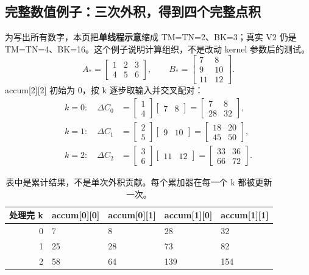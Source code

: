 \subsection{完整数值例子：三次外积，得到四个完整点积}
为写出所有数字，本页把\textbf{单线程示意}缩成 TM=TN=2、BK=3；真实 V2 仍是 TM=TN=4、BK=16。这个例子说明计算组织，不是改动 kernel 参数后的测试。
\[
A_* = \begin{bmatrix}1&2&3\\4&5&6\end{bmatrix},\qquad
B_* = \begin{bmatrix}7&8\\9&10\\11&12\end{bmatrix}.
\]
accum[2][2] 初始为 0，按 k 逐步取输入并交叉配对：
\begin{align*}
k=0:\quad \Delta C_0&=\begin{bmatrix}1\\4\end{bmatrix}\begin{bmatrix}7&8\end{bmatrix}
=\begin{bmatrix}7&8\\28&32\end{bmatrix},\\[0.3em]
k=1:\quad \Delta C_1&=\begin{bmatrix}2\\5\end{bmatrix}\begin{bmatrix}9&10\end{bmatrix}
=\begin{bmatrix}18&20\\45&50\end{bmatrix},\\[0.3em]
k=2:\quad \Delta C_2&=\begin{bmatrix}3\\6\end{bmatrix}\begin{bmatrix}11&12\end{bmatrix}
=\begin{bmatrix}33&36\\66&72\end{bmatrix}.
\end{align*}
\begin{table}[H]\centering
\begin{tabular}{rllll}
\toprule
处理完 k & accum[0][0] & accum[0][1] & accum[1][0] & accum[1][1]\\\midrule
0 & 7 & 8 & 28 & 32\\
1 & 25 & 28 & 73 & 82\\
2 & 58 & 64 & 139 & 154\\\bottomrule
\end{tabular}
\caption{表中是累计结果，不是单次外积贡献。每个累加器在每一个 k 都被更新一次。}
\end{table}
